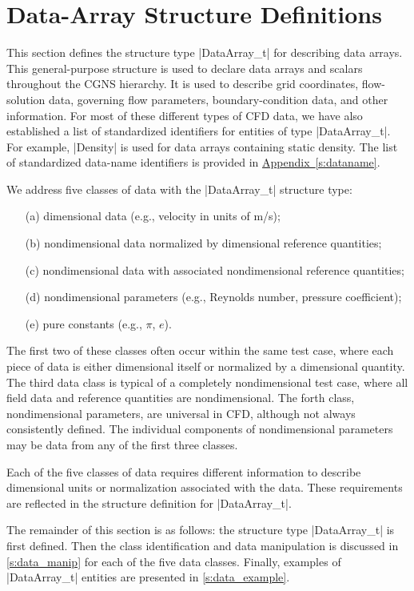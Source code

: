 \section{Data-Array Structure Definitions}
\label{s:data}
\thispagestyle{plain}

This section defines the structure type |DataArray_t| for describing
data arrays.  This general-purpose structure is used to declare
data arrays and scalars throughout the CGNS hierarchy.  It is used
to describe grid coordinates, flow-solution data, governing flow
parameters, boundary-condition data, and other information.  For most
of these different types of CFD data, we have also established a
list of standardized identifiers for entities of type |DataArray_t|.
For example, |Density| is used for data arrays containing static
density.  The list of standardized data-name identifiers is provided in
\hyperref[s:dataname]{Appendix~\ref*{s:dataname}}.

We address five classes of data with the |DataArray_t| structure type:
\begin{enumerate}
\item[(a)] dimensional data (e.g., velocity in units of m/s);
\item[(b)] nondimensional data normalized by dimensional reference
           quantities;
\item[(c)] nondimensional data with associated nondimensional reference
           quantities;
\item[(d)] nondimensional parameters (e.g., Reynolds number, pressure
           coefficient);
\item[(e)] pure constants (e.g., $\pi$, $e$).
\end{enumerate}
The first two of these classes often occur within the same test case,
where each piece of data is either dimensional itself or normalized by a
dimensional quantity.  The third data class is typical of a completely
nondimensional test case, where all field data and reference quantities
are nondimensional.  The forth class, nondimensional parameters, are
universal in CFD, although not always consistently defined.  The
individual components of nondimensional parameters may be data from any
of the first three classes.

Each of the five classes of data requires different information to
describe dimensional units or normalization associated with the data.
These requirements are reflected in the structure definition for
|DataArray_t|.

The remainder of this section is as follows: the structure type
|DataArray_t| is first defined.  Then the class identification and data
manipulation is discussed in \autoref{s:data_manip} for each of the five data
classes.  Finally, examples of |DataArray_t| entities are presented in
\autoref{s:data_example}.

